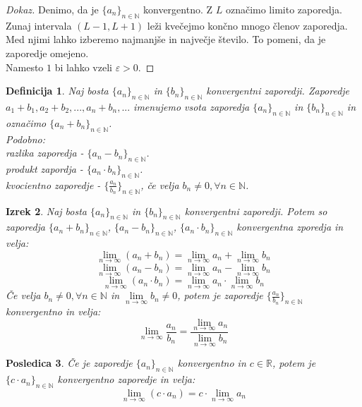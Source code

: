 \documentclass[11pt]{article}
\newtheorem{Izrek}{{\sc Izrek}}[section]
\newtheorem{Posledica}[Izrek]{{\sc Posledica}}
\newtheorem{Definicija}[Izrek]{{\sc Definicija}}
\newenvironment{dokaz}[1][{\sc Dokaz}]{\begin{proof}[#1]\renewcommand*{\qedsymbol}{\(\blacksquare\)}}{\end{proof}}
\begin{document}
\begin{dokaz}
	Denimo, da je $\{a_n\}_{n\in \mathbb{N}}$ konvergentno. Z $L$ označimo limito zaporedja.
	\\
	Zunaj intervala $(L - 1, L+ 1)$ leži kvečejmo končno mnogo členov zaporedja. Med njimi lahko izberemo najmanjše in največje število. To pomeni, da je zaporedje omejeno.
	\\
	Namesto $1$ bi lahko vzeli $\varepsilon > 0$.
\end{dokaz}
\begin{Definicija}
	Naj bosta $\{a_n\}_{n\in \mathbb{N}}$ in $\{b_n\}_{n\in \mathbb{N}}$ konvergentni zaporedji. Zaporedje $a_1 + b_1, a_2 + b_2,..., a_n + b_n, ... $ imenujemo vsota zaporedja $\{a_n\}_{n\in \mathbb{N}}$ in $\{b_n\}_{n\in \mathbb{N}}$ in označimo $\{a_n + b_n\}_{n\in \mathbb{N}}$.
	\\
	Podobno:
	\\
	razlika zaporedja  - $\{a_n - b_n\}_{n\in \mathbb{N}}$.
	\\
	produkt zapordja - $\{a_n \cdot b_n\}_{n\in \mathbb{N}}$.
	\\
	kvocientno zaporedje - $\{\frac{a_n}{b_n}\}_{n\in \mathbb{N}}$, če velja $b_n \ne 0, \forall n\in \mathbb{N}$.
\end{Definicija}
\begin{Izrek}
	Naj bosta $\{a_n\}_{n\in \mathbb{N}}$ in $\{b_n\}_{n\in \mathbb{N}}$ konvergentni zaporedji. Potem so zaporedja $\{a_n + b_n\}_{n\in \mathbb{N}}$,  $\{a_n - b_n\}_{n\in \mathbb{N}}$, $\{a_n \cdot b_n\}_{n\in \mathbb{N}}$ konvergentna zporedja in velja:
	$$\lim\limits_{n \to \infty}{(a_n + b_n)} = \lim\limits_{n \to \infty}{a_n} + \lim\limits_{n \to \infty}{b_n}$$
	$$\lim\limits_{n \to \infty}{(a_n - b_n)} = \lim\limits_{n \to \infty}{a_n} - \lim\limits_{n \to \infty}{b_n}$$
	$$\lim\limits_{n \to \infty}{(a_n \cdot b_n)} = \lim\limits_{n \to \infty}{a_n} \cdot \lim\limits_{n \to \infty}{b_n}$$
	Če velja $b_n \ne 0, \forall n\in \mathbb{N}$ in $\lim\limits_{n \to \infty}{b_n} \ne 0$, potem je zaporedje $\{\frac{a_n}{b_n}\}_{n\in \mathbb{N}}$ konvergentno in velja: $$\lim\limits_{n \to \infty}{\frac{a_n}{b_n}} = \frac{\lim\limits_{n \to \infty}{a_n}}{\lim\limits_{n \to \infty}{b_n}}$$
\end{Izrek}	
\begin{Posledica}
	Če je zaporedje  $\{a_n\}_{n\in \mathbb{N}}$ konvergentno in $c \in \mathbb{R}$, potem je \newline $\{c \cdot a_n\}_{n\in \mathbb{N}}$ konvergentno zaporedje in velja:
	$$\lim\limits_{n \to \infty}{(c \cdot a_n)} = c \cdot  \lim\limits_{n \to \infty}{a_n}$$
\end{Posledica}
\end{document}

